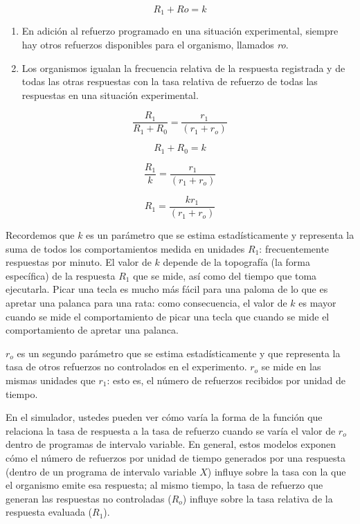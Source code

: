 \documentclass[
  letterpaper,
]{book}
\begin{document}
\[R_1 +Ro = k\]

\begin{enumerate}
\def\labelenumi{\arabic{enumi}.}
\setcounter{enumi}{1}
\item
  En adición al refuerzo programado en una situación experimental,
  siempre hay otros refuerzos disponibles para el organismo, llamados
  \emph{ro}.
\item
  Los organismos igualan la frecuencia relativa de la respuesta
  registrada y de todas las otras respuestas con la tasa relativa de
  refuerzo de todas las respuestas en una situación experimental.
\end{enumerate}

\[
\frac{R_1}{R_1 + R_0}= \frac {r_1} {(r_1 + r_o)}
\]

\[
R_1+R_0 = k
\]

\[
\frac{R_1}{k}= \frac {r_1} {(r_1 + r_o)}
\]

\[
R_1= \frac{kr_1} {(r_1 + r_o)}
\]

Recordemos que \(k\) es un parámetro que se estima estadísticamente y
representa la suma de todos los comportamientos medida en unidades
\(R_1\): frecuentemente respuestas por minuto. El valor de \(k\) depende
de la topografía (la forma específica) de la respuesta \(R_1\) que se
mide, así como del tiempo que toma ejecutarla. Picar una tecla es mucho
más fácil para una paloma de lo que es apretar una palanca para una
rata: como consecuencia, el valor de \(k\) es mayor cuando se mide el
comportamiento de picar una tecla que cuando se mide el comportamiento
de apretar una palanca.

\(r_o\) es un segundo parámetro que se estima estadísticamente y que
representa la tasa de otros refuerzos no controlados en el experimento.
\(r_o\) se mide en las mismas unidades que \(r_1\): esto es, el número
de refuerzos recibidos por unidad de tiempo.

En el simulador, ustedes pueden ver cómo varía la forma de la función
que relaciona la tasa de respuesta a la tasa de refuerzo cuando se varía
el valor de \(r_o\) dentro de programas de intervalo variable. En
general, estos modelos exponen cómo el número de refuerzos por unidad de
tiempo generados por una respuesta (dentro de un programa de intervalo
variable \(X\)) influye sobre la tasa con la que el organismo emite esa
respuesta; al mismo tiempo, la tasa de refuerzo que generan las
respuestas no controladas (\(R_o\)) influye sobre la tasa relativa de la
respuesta evaluada (\(R_1\)).
\end{document}
